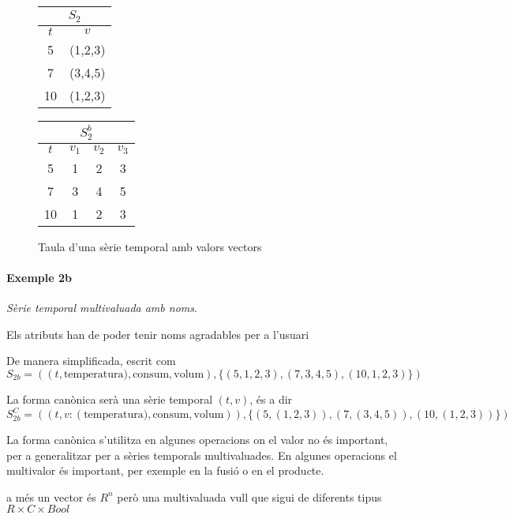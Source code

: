 \begin{figure}[tp]
  \centering
  \begin{tabular}{|c|c|}
    \multicolumn{2}{c}{$S_2$} \\ \hline
    $t$  & $v$ \\ \hline
    5  & (1,2,3) \\
    7  & (3,4,5) \\
    10 & (1,2,3) \\ \hline
  \end{tabular} \qquad
  \begin{tabular}[tp]{|c|c|c|c|}
   \multicolumn{4}{c}{$S_2^b$} \\ \hline
    $t$  & $v_1$ & $v_2$ & $v_3$ \\ \hline
    5  & 1 & 2 & 3 \\
    7  & 3 & 4 & 5 \\
    10 & 1 & 2 & 3 \\ \hline
  \end{tabular}

  \caption{Taula d'una sèrie temporal amb valors vectors}
  \label{fig:model:serietemporal:vector}
\end{figure}




\paragraph{Exemple 2b} \emph{Sèrie temporal multivaluada amb noms}.


Els atributs han de poder tenir noms agradables per a l'usuari

De manera simplificada, escrit com
$S_{2b} = ( (t,\text{temperatura)},\text{consum},\text{volum}),\{ (5,1,2,3), (7,3,4,5), (10,1,2,3) \})$


La forma canònica serà una sèrie temporal $(t,v)$, és a dir  $S^C_{2b} = ( (t,v:(\text{temperatura)},\text{consum},\text{volum})),\{ (5,(1,2,3)), (7,(3,4,5)), (10,(1,2,3)) \})$

La forma canònica s'utilitza en algunes operacions on el valor no és important, per a generalitzar per a sèries temporals multivaluades. En algunes operacions el multivalor és important, per exemple en la fusió o en el producte.


a més un vector és $R^n$ però una multivaluada vull que sigui de diferents tipus $R\times C \times Bool$



